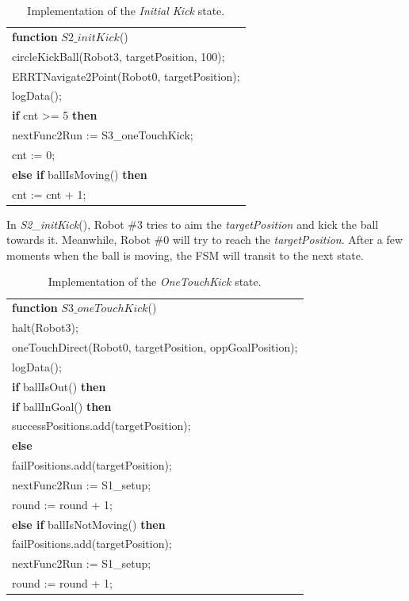 \documentclass[runningheads]{llncs}
\begin{document}
\begin{table}[H]
\caption{Implementation of the \textit{Initial Kick} state.}
\center
\label{table_STATE2_IMP}
\begin{tabular}{|p{10cm}|}
\hline

\textbf{function}
$ S2\_initKick$()\\
\quad circleKickBall(Robot3, targetPosition, 100);\\
\quad ERRTNavigate2Point(Robot0, targetPosition);\\
\quad logData();\\
\quad \textbf{if} cnt >= 5 \textbf{then}\\
\quad\quad nextFunc2Run := S3\_oneTouchKick;\\
\quad\quad cnt := 0;\\
\quad \textbf{else if} ballIsMoving() \textbf{then}\\
\quad\quad cnt := cnt + 1;\\

\hline
\end{tabular}
\end{table}

In \textit{S2\_initKick}(), Robot \#3 tries to aim the \textit{targetPosition} and kick the ball towards it. Meanwhile, Robot \#0 will try to reach the \textit{targetPosition}. After a few moments when the ball is moving, the FSM will transit to the next state.


\begin{table}[H]
\caption{Implementation of the \textit{OneTouchKick} state.}
\center
\label{table_STATE3_IMP}
\begin{tabular}{|p{10cm}|}
\hline

\textbf{function}
$ S3\_oneTouchKick$()\\
\quad halt(Robot3);\\
\quad oneTouchDirect(Robot0, targetPosition, oppGoalPosition);\\
\quad logData();\\
\quad \textbf{if} ballIsOut() \textbf{then}\\
\quad\quad \textbf{if} ballInGoal() \textbf{then}\\
\quad\quad\quad successPositions.add(targetPosition);\\
\quad\quad \textbf{else} \\ 
\quad\quad\quad failPositions.add(targetPosition);\\
\quad\quad nextFunc2Run := S1\_setup;\\
\quad\quad round := round + 1;\\
\quad \textbf{else if} ballIsNotMoving() \textbf{then}\\
\quad\quad failPositions.add(targetPosition);\\
\quad\quad nextFunc2Run := S1\_setup;\\
\quad\quad round := round + 1;\\

\hline
\end{tabular}
\end{table}
\end{document}
